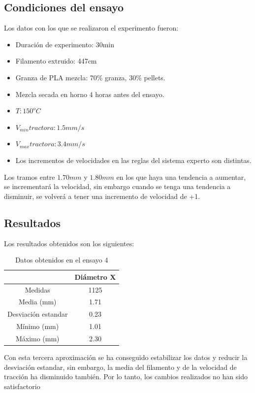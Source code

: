 \subsection{Condiciones del ensayo}

Los datos con los que se realizaron el experimento fueron:

\begin{itemize}
	\item{Duración de experimento: 30min}
	\item{Filamento extruido: 447cm}
	\item{Granza de PLA mezcla: 70\% granza, 30\% pellets.}
	\item{Mezcla secada en horno 4 horas antes del ensayo.}
	\item{$T: 150^oC$}
	\item{$V_{min} tractora: 1.5 mm/s$}
	\item{$V_{max} tractora: 3.4 mm/s$}
	\item{Los incrementos de velocidades en las reglas del sistema experto son distintas.}
\end{itemize}

 Los tramos entre $1.70 mm$ y $1.80mm$ en los que haya una tendencia a aumentar, se incrementará la velocidad, sin embargo cuando se tenga una tendencia a disminuir, se volverá a tener una incremento de velocidad de +1.

\subsection{Resultados}
Los resultados obtenidos son los siguientes:

\begin{table}[H]
	\centering
	\begin{tabular}{cc}
		                    & Diámetro X \\ \hline
		Medidas             & 1125      \\
		Media (mm)          & 1.71       \\
		Desviación estandar & 0.23       \\
		Mínimo (mm)         & 1.01       \\
		Máximo (mm)         & 2.30      
	\end{tabular}
	\caption{Datos obtenidos en el ensayo 4}
	\label{tab:resl_ens4}
\end{table}

Con esta tercera aproximación se ha conseguido estabilizar los datos y reducir la desviación estandar, sin embargo, la media del filamento y de la velocidad de tracción ha disminuido también. Por lo tanto, los cambios realizados no han sido satisfactorio

